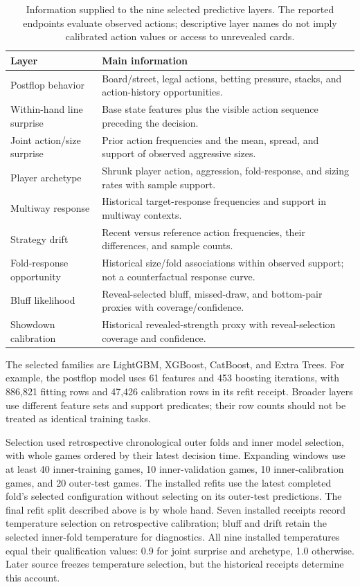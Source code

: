 \documentclass[11pt]{article}
\begin{document}
\begin{table}[!htbp]
\centering\small
\caption{Information supplied to the nine selected predictive layers. The reported endpoints evaluate observed actions; descriptive layer names do not imply calibrated action values or access to unrevealed cards.}
\label{tab:features}
\begin{tabularx}{\textwidth}{p{}Y}
\toprule
Layer & Main information \\
\midrule
Postflop behavior & Board/street, legal actions, betting pressure, stacks, and action-history opportunities. \\
Within-hand line surprise & Base state features plus the visible action sequence preceding the decision. \\
Joint action/size surprise & Prior action frequencies and the mean, spread, and support of observed aggressive sizes. \\
Player archetype & Shrunk player action, aggression, fold-response, and sizing rates with sample support. \\
Multiway response & Historical target-response frequencies and support in multiway contexts. \\
Strategy drift & Recent versus reference action frequencies, their differences, and sample counts. \\
Fold-response opportunity & Historical size/fold associations within observed support; not a counterfactual response curve. \\
Bluff likelihood & Reveal-selected bluff, missed-draw, and bottom-pair proxies with coverage/confidence. \\
Showdown calibration & Historical revealed-strength proxy with reveal-selection coverage and confidence. \\
\bottomrule
\end{tabularx}
\end{table}

The selected families are LightGBM, XGBoost, CatBoost, and Extra Trees. For example, the postflop model uses 61 features and 453 boosting iterations, with 886,821 fitting rows and 47,426 calibration rows in its refit receipt. Broader layers use different feature sets and support predicates; their row counts should not be treated as identical training tasks.

Selection used retrospective chronological outer folds and inner model selection, with whole games ordered by their latest decision time. Expanding windows use at least 40 inner-training games, 10 inner-validation games, 10 inner-calibration games, and 20 outer-test games. The installed refits use the latest completed fold's selected configuration without selecting on its outer-test predictions. The final refit split described above is by whole hand. Seven installed receipts record temperature selection on retrospective calibration; bluff and drift retain the selected inner-fold temperature for diagnostics. All nine installed temperatures equal their qualification values: 0.9 for joint surprise and archetype, 1.0 otherwise. Later source freezes temperature selection, but the historical receipts determine this account.
\end{document}
